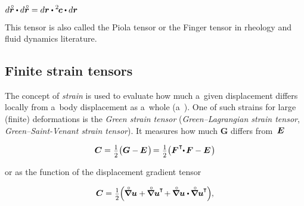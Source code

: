 ${\displaystyle d\initiallocationvector \dotp d\initiallocationvector = d\currentlocationvector \dotp {^2\hspace{-0.2ex}\bm{c}} \dotp d\currentlocationvector}$

This tensor is also called the Piola tensor or the Finger tensor in rheology and fluid dynamics literature.

\subsection*{Finite strain tensors}

The concept of \emph{strain} is used to evaluate how much a~given displacement differs locally from a~body displacement as a~whole (a~).
One of such strains for large (finite) deformations is the \emph{Green strain tensor}
(\emph{Green\hbox{--}Lagrangian strain tensor}, \emph{Green\hbox{--}Saint\hbox{-\hspace{-0.2ex}}Venant strain tensor}).
It measures how much $\bm{G}$ differs from~$\bm{E}$

\nopagebreak\begin{equation}
\label{theGreenFiniteStrainTensor}
\displaystyle \bm{C}
= \hspace{.1ex} \smalldisplaystyleonehalf \bigl( \bm{G} - \hspace{-0.1ex} \UnitDyad \hspace{.2ex} \bigr) \hspace{-0.3ex}
= \hspace{.1ex} \smalldisplaystyleonehalf \bigl( \bm{F}^{\hspace{.1ex}\T} \hspace{-0.6ex} \dotp \hspace{-0.2ex} \bm{F} - \UnitDyad \hspace{.2ex} \bigr)
\end{equation}

\noindent
or as the function of the displacement gradient tensor

\nopagebreak\begin{equation*}
\displaystyle \bm{C} = \hspace{.1ex} \smalldisplaystyleonehalf \hspace{-0.1ex} \Bigl( \hspace{-0.1ex}
     \boldnablacircled\bm{u}
     + \hspace{-0.1ex} \boldnablacircled\bm{u}^{\hspace{-0.1ex}\T} \hspace{-0.3ex}
     + \hspace{-0.1ex} \boldnablacircled\bm{u} \dotp \hspace{-0.1ex} \boldnablacircled\bm{u}^{\hspace{-0.1ex}\T} \hspace{-0.1ex}
\Bigr)
\hspace{-0.1ex} ,
\end{equation*}

